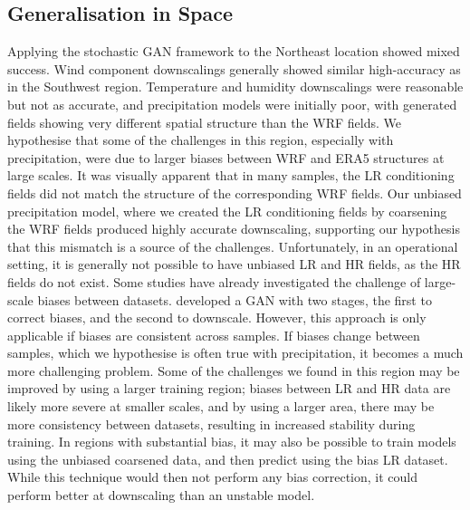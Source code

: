 \documentclass{ametsocV6.1}
\begin{document}
\subsection{Generalisation in Space}
Applying the stochastic GAN framework to the Northeast location showed mixed success. Wind component downscalings generally showed similar high-accuracy as in the Southwest region. Temperature and humidity downscalings were reasonable but not as accurate, and precipitation models were initially poor, with generated fields showing very different spatial structure than the WRF fields. We hypothesise that some of the challenges in this region, especially with precipitation, were due to larger biases between WRF and ERA5 structures at large scales. It was visually apparent that in many samples, the LR conditioning fields did not match the structure of the corresponding WRF fields. Our unbiased precipitation model, where we created the LR conditioning fields by coarsening the WRF fields produced highly accurate downscaling, supporting our hypothesis that this mismatch is a source of the challenges. Unfortunately, in an operational setting, it is generally not possible to have unbiased LR and HR fields, as the HR fields do not exist. Some studies have already investigated the challenge of large-scale biases between datasets. \citet{price2022increasing} developed a GAN with two stages, the first to correct biases, and the second to downscale. However, this approach is only applicable if biases are consistent across samples. If biases change between samples, which we hypothesise is often true with precipitation, it becomes a much more challenging problem. Some of the challenges we found in this region may be improved by using a larger training region; biases between LR and HR data are likely more severe at smaller scales, and by using a larger area, there may be more consistency between datasets, resulting in increased stability during training. In regions with substantial bias, it may also be possible to train models using the unbiased coarsened data, and then predict using the bias LR dataset. While this technique would then not perform any bias correction, it could perform better at downscaling than an unstable model.
\end{document}
